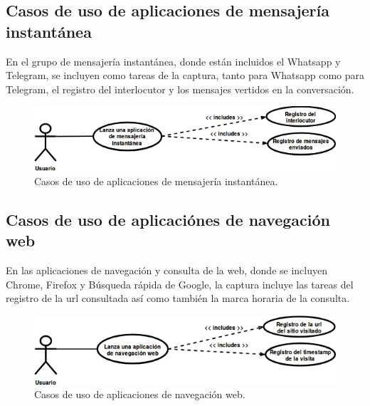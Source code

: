 \documentclass[12pt,a4paper,oneside]{book} %
\begin{document}
\subsection{Casos de uso de aplicaciones de mensajería instantánea}
En el grupo de mensajería instantánea, donde están incluidos el Whatsapp y Telegram, se incluyen como tareas de la captura, tanto para Whatsapp como para Telegram, el registro del interlocutor y los mensajes vertidos en la conversación. 
\begin{figure}[H]
	\begin{center}
		\includegraphics[scale=0.70]{pictures/usecases/usecases03.png} %
	\end{center}
	\caption[Casos de uso de aplicaciones de mensajería instantánea.]{Casos de uso de aplicaciones de mensajería instantánea.}
\end{figure}
\subsection{Casos de uso de aplicaciónes de navegación web}
En las aplicaciones de navegación y consulta de la web, donde se incluyen Chrome, Firefox y Búsqueda rápida de Google, la captura incluye las tareas del registro de la url consultada así como también la marca horaria de la consulta. 
\begin{figure}[H]
	\begin{center}
		\includegraphics[scale=0.70]{pictures/usecases/usecases04.png} %
	\end{center}
	\caption[Casos de uso de aplicaciones de navegación web.]{Casos de uso de aplicaciones de navegación web.}
\end{figure}
\end{document}
